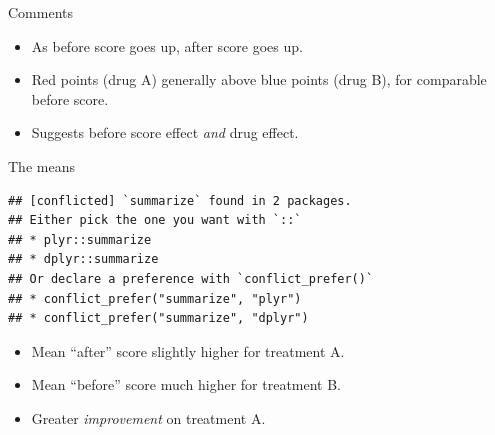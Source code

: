 \documentclass[ignorenonframetext,]{beamer}
\newenvironment{Shaded}{\begin{snugshade}}{\end{snugshade}}
\newcommand{\DataTypeTok}[1]{\textcolor[rgb]{0.13,0.29,0.53}{#1}}
\newcommand{\KeywordTok}[1]{\textcolor[rgb]{0.13,0.29,0.53}{\textbf{#1}}}
\newcommand{\NormalTok}[1]{#1}
\newcommand{\OperatorTok}[1]{\textcolor[rgb]{0.81,0.36,0.00}{\textbf{#1}}}
\newcommand{\StringTok}[1]{\textcolor[rgb]{0.31,0.60,0.02}{#1}}
\begin{document}
\begin{frame}{Comments}
\protect\hypertarget{comments-17}{}

\begin{itemize}
\item
  As before score goes up, after score goes up.
\item
  Red points (drug A) generally above blue points (drug B), for
  comparable before score.
\item
  Suggests before score effect \emph{and} drug effect.
\end{itemize}

\end{frame}

\begin{frame}[fragile]{The means}
\protect\hypertarget{the-means}{}

\begin{Shaded}
\end{Shaded}

\begin{verbatim}
## [conflicted] `summarize` found in 2 packages.
## Either pick the one you want with `::` 
## * plyr::summarize
## * dplyr::summarize
## Or declare a preference with `conflict_prefer()`
## * conflict_prefer("summarize", "plyr")
## * conflict_prefer("summarize", "dplyr")
\end{verbatim}

\begin{itemize}
\item
  Mean ``after'' score slightly higher for treatment A.
\item
  Mean ``before'' score much higher for treatment B.
\item
  Greater \emph{improvement} on treatment A.
\end{itemize}

\end{frame}
\end{document}
